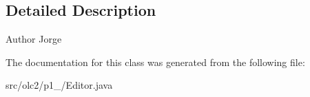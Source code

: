 \subsection{Detailed Description}
\begin{DoxyAuthor}{Author}
Jorge 
\end{DoxyAuthor}


The documentation for this class was generated from the following file\+:\begin{DoxyCompactItemize}
\item 
src/olc2/p1\+\_/Editor.\+java\end{DoxyCompactItemize}
